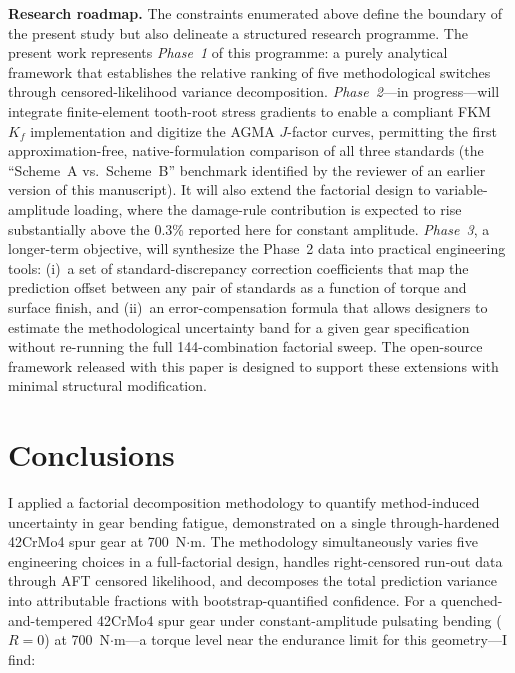 \documentclass[12pt,a4paper]{article}
\begin{document}
\medskip
\noindent\textbf{Research roadmap.}
The constraints enumerated above define the boundary of the present
study but also delineate a structured research programme. The present
work represents \emph{Phase~1} of this programme: a purely analytical
framework that establishes the relative ranking of five
methodological switches through censored-likelihood variance
decomposition. \emph{Phase~2}---in progress---will
integrate finite-element tooth-root stress gradients to enable a
compliant FKM $K_f$ implementation and digitize the AGMA $J$-factor
curves, permitting the first approximation-free, native-formulation
comparison of all three standards (the ``Scheme~A vs.\ Scheme~B''
benchmark identified by the reviewer of an earlier version of this
manuscript). It will also extend the factorial design to
variable-amplitude loading, where the damage-rule contribution is
expected to rise substantially above the 0.3\% reported here for
constant amplitude. \emph{Phase~3}, a longer-term objective, will
synthesize the Phase~2 data into practical engineering tools: (i)~a
set of standard-discrepancy correction coefficients that map the
prediction offset between any pair of standards as a function of
torque and surface finish, and (ii)~an error-compensation formula
that allows designers to estimate the methodological uncertainty
band for a given gear specification without re-running the full
144-combination factorial sweep. The open-source framework released
with this paper is designed to support these extensions with
minimal structural modification.

\section{Conclusions}
\label{sec:conclusions}

I applied a factorial decomposition methodology to quantify
method-induced uncertainty in gear bending fatigue, demonstrated
on a single through-hardened 42CrMo4 spur gear at 700~N$\cdot$m.
The methodology
simultaneously varies five engineering choices in a full-factorial
design, handles right-censored run-out data through AFT censored
likelihood, and decomposes the total prediction variance into
attributable fractions with bootstrap-quantified confidence. For a
quenched-and-tempered 42CrMo4 spur gear under constant-amplitude
pulsating bending ($R=0$) at 700~N$\cdot$m---a torque level near the
endurance limit for this geometry---I find:
\end{document}
